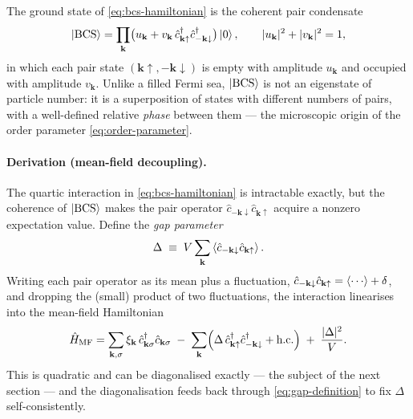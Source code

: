 \begin{statement}
\label{stmt:bcs-ground-state}
The ground state of \cref{eq:bcs-hamiltonian} is the coherent pair
condensate
\begin{equation}
\label{eq:bcs-state}
\ket{\rm BCS}
= \prod_{\mathbf k}
  \bigl(u_{\mathbf k}
   + v_{\mathbf k}\,\hat c^\dagger_{\mathbf k\uparrow}
     \hat c^\dagger_{-\mathbf k\downarrow}\bigr)\ket0,
\qquad
|u_{\mathbf k}|^2 + |v_{\mathbf k}|^2 = 1,
\end{equation}
in which each pair state $(\mathbf k\uparrow,-\mathbf k\downarrow)$ is
empty with amplitude $u_{\mathbf k}$ and occupied with amplitude
$v_{\mathbf k}$. Unlike a filled Fermi sea, $\ket{\rm BCS}$ is not an
eigenstate of particle number: it is a superposition of states with
different numbers of pairs, with a well-defined relative \emph{phase}
between them --- the microscopic origin of the order parameter
\cref{eq:order-parameter}.
\end{statement}

\paragraph{Derivation (mean-field decoupling).}
The quartic interaction in \cref{eq:bcs-hamiltonian} is intractable
exactly, but the coherence of $\ket{\rm BCS}$ makes the pair operator
$\hat c_{-\mathbf k\downarrow}\hat c_{\mathbf k\uparrow}$ acquire a
nonzero expectation value. Define the \emph{gap parameter}
\begin{equation}
\label{eq:gap-definition}
\Delta \;\equiv\; V\sum_{\mathbf k}
  \expval{\hat c_{-\mathbf k\downarrow}\hat c_{\mathbf k\uparrow}}.
\end{equation}
Writing each pair operator as its mean plus a fluctuation,
$\hat c_{-\mathbf k\downarrow}\hat c_{\mathbf k\uparrow}
=\expval{\cdots}+\delta$, and dropping the (small) product of two
fluctuations, the interaction linearises into the mean-field
Hamiltonian
\begin{equation}
\label{eq:bcs-meanfield}
\hat{H}_{\rm MF}
= \sum_{\mathbf k,\sigma}\xi_{\mathbf k}\,
  \hat c^\dagger_{\mathbf k\sigma}\hat c_{\mathbf k\sigma}
  \;-\;\sum_{\mathbf k}\Bigl(
  \Delta\,\hat c^\dagger_{\mathbf k\uparrow}
    \hat c^\dagger_{-\mathbf k\downarrow} + \text{h.c.}\Bigr)
  \;+\;\frac{|\Delta|^2}{V}.
\end{equation}
This is quadratic and can be diagonalised exactly --- the subject of
the next section --- and the diagonalisation feeds back through
\cref{eq:gap-definition} to fix $\Delta$ self-consistently.

